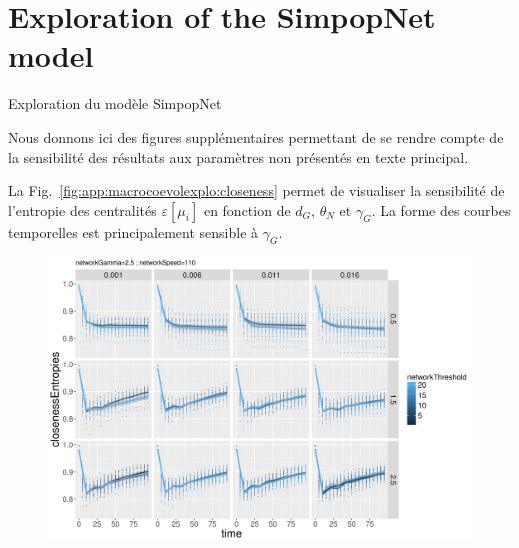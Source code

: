 






\newpage

\section{Exploration of the SimpopNet model}{Exploration du modèle SimpopNet}

\label{app:sec:macrocoevolexplo}


Nous donnons ici des figures supplémentaires permettant de se rendre compte de la sensibilité des résultats aux paramètres non présentés en texte principal.


La Fig.~\ref{fig:app:macrocoevolexplo:closeness} permet de visualiser la sensibilité de l'entropie des centralités $\varepsilon \left[\mu_i\right]$ en fonction de $d_G$, $\theta_N$ et $\gamma_G$. La forme des courbes temporelles est principalement sensible à $\gamma_G$.


\begin{figure}
    \includegraphics[width=\linewidth]{Figures/Final/A-macrocoevolexplo-closeness.jpg}
\end{figure}


